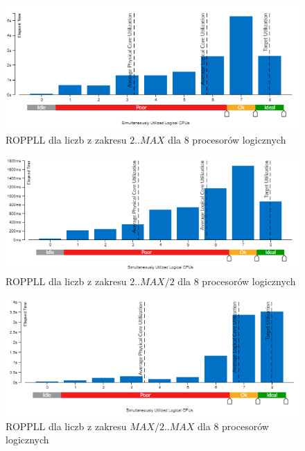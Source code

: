 \documentclass{article}
\begin{document}
                \begin{figure}[H]
                    \includegraphics[width=13cm]{rownolegly_funcion_bezsita8_2_MAX}
                    \caption{\gls{ROPPLL} dla liczb z zakresu $2 .. MAX$ dla 8 procesorów logicznych}
                \end{figure}
                \begin{figure}[H]
                    \includegraphics[width=13cm]{rownolegly_funcion_bezsita8_2_MAX2}
                    \caption{\gls{ROPPLL} dla liczb z zakresu $2 .. MAX / 2$ dla 8 procesorów logicznych}
                \end{figure}
                \begin{figure}[H]
                    \includegraphics[width=13cm]{rownolegly_funcion_bezsita8_MAX2_MAX}
                    \caption{\gls{ROPPLL} dla liczb z zakresu $MAX / 2 .. MAX$ dla 8 procesorów logicznych}
                \end{figure}
        
    
    \clearpage
    \printnoidxglossaries
\end{document}
